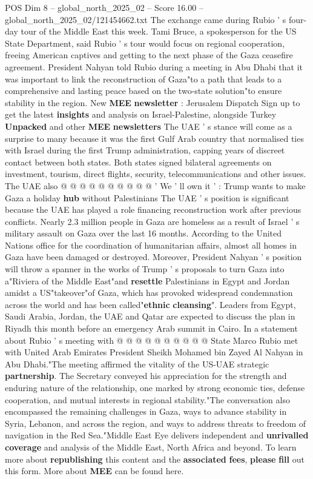 \begin{textsample}{POS Dim 8 – global\_north\_2025\_02 – Score 16.00 – global\_north\_2025\_02/121454662.txt}  \label{ex:f8_pos_002}
The exchange came during Rubio ' s four-day tour of the Middle East this week.
Tami Bruce, a spokesperson for the US State Department, said Rubio ' s tour would focus on regional cooperation, freeing American captives and getting to the next phase of the Gaza ceasefire agreement.
President Nahyan told Rubio during a meeting in Abu Dhabi that it was important to link the reconstruction of Gaza"to a path that leads to a comprehensive and lasting peace based on the two-state solution"to ensure stability in the region.
New \textbf{MEE} \textbf{newsletter} : Jerusalem Dispatch Sign up to get the latest \textbf{insights} and analysis on Israel-Palestine, alongside Turkey \textbf{Unpacked} and other \textbf{MEE} \textbf{newsletters} The UAE ' s stance will come as a surprise to many because it was the first Gulf Arab country that normalised ties with Israel during the first Trump administration, capping years of discreet contact between both states.
Both states signed bilateral agreements on investment, tourism, direct flights, security, telecommunications and other issues.
The UAE also @ @ @ @ @ @ @ @ @ @ ' We ' ll own it ' : Trump wants to make Gaza a holiday \textbf{hub} without Palestinians The UAE ' s position is significant because the UAE has played a role financing reconstruction work after previous conflicts.
Nearly 2.3 million people in Gaza are homeless as a result of Israel ' s military assault on Gaza over the last 16 months.
According to the United Nations office for the coordination of humanitarian affairs, almost all homes in Gaza have been damaged or destroyed.
Moreover, President Nahyan ' s position will throw a spanner in the works of Trump ' s proposals to turn Gaza into a"Riviera of the Middle East"and \textbf{resettle} Palestinians in Egypt and Jordan amidst a US"takeover"of Gaza, which has provoked widespread condemnation across the world and has been called"\textbf{ethnic} \textbf{cleansing}".
Leaders from Egypt, Saudi Arabia, Jordan, the UAE and Qatar are expected to discuss the plan in Riyadh this month before an emergency Arab summit in Cairo.
In a statement about Rubio ' s meeting with @ @ @ @ @ @ @ @ @ @ State Marco Rubio met with United Arab Emirates President Sheikh Mohamed bin Zayed Al Nahyan in Abu Dhabi."The meeting affirmed the vitality of the US-UAE strategic \textbf{partnership}.
The Secretary conveyed his appreciation for the strength and enduring nature of the relationship, one marked by strong economic ties, defense cooperation, and mutual interests in regional stability."The conversation also encompassed the remaining challenges in Gaza, ways to advance stability in Syria, Lebanon, and across the region, and ways to address threats to freedom of navigation in the Red Sea."Middle East Eye delivers independent and \textbf{unrivalled} \textbf{coverage} and analysis of the Middle East, North Africa and beyond.
To learn more about \textbf{republishing} this content and the \textbf{associated} \textbf{fees}, \textbf{please} \textbf{fill} out this form.
More about \textbf{MEE} can be found here.


\end{textsample}
